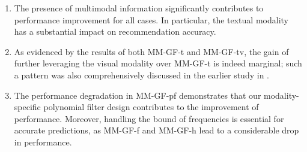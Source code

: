 \documentclass[a4paper,fleqn]{cas-sc}
\renewcommand{\cite}{\citep}
\begin{document}
\begin{enumerate}[label=(\roman*)]
    \item  The presence of multimodal information significantly contributes to performance improvement for all cases. In particular, the textual modality has a substantial impact on recommendation accuracy.

    \item As evidenced by the results of both \textsf{MM-GF-t} and \textsf{MM-GF-tv}, the gain of further leveraging the visual modality over \textsf{MM-GF-t} is indeed marginal; such a pattern was also comprehensively discussed in the earlier study in \cite{zhou2023comprehensive}.

    \item The performance degradation in \textsf{MM-GF-pf} demonstrates that our modality-specific polynomial filter design contributes to the improvement of performance. Moreover, handling the bound of frequencies is essential for accurate predictions, as \textsf{MM-GF-f} and \textsf{MM-GF-h} lead to a considerable drop in performance.

\end{enumerate}
\end{document}
